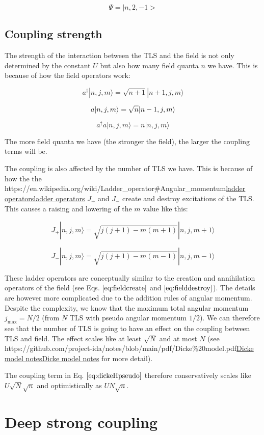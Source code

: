 \documentclass[
]{article}
\let\oldhref\href
\renewcommand{\href}[2]{\ifx#1\urlprefix\oldhref{#1}{#2}\else\uline{\oldhref{#1}{#2}}\fi}
\renewcommand{\[}{\begin{equation}}
\renewcommand{\]}{\end{equation}}
\begin{document}
\[
\Psi = |n,2,-1>
\]

\subsection{Coupling strength}\label{coupling-strength}

The strength of the interaction between the TLS and the field is not
only determined by the constant \(U\) but also how many field quanta
\(n\) we have. This is because of how the field operators work:

\[
a^{\dagger} |n,j,m\rangle = \sqrt{n+1}|n+1,j,m\rangle
\label{eq:fieldcreate}
\]

\[
a |n,j,m\rangle = \sqrt{n}|n-1,j,m\rangle \\
\label{eq:fielddestroy}
\]

\[
a^{\dagger}a |n,j,m\rangle = n|n,j,m\rangle
\]

The more field quanta we have (the stronger the field), the larger the
coupling terms will be.

The coupling is also affected by the number of TLS we have. This is
because of how the the
\href{https://en.wikipedia.org/wiki/Ladder_operator\#Angular_momentum}{ladder
operators} \(J_{+}\) and \(J_{-}\) create and destroy excitations of the
TLS. This causes a raising and lowering of the \(m\) value like this:

\[
J_+ |n, j, m\rangle  =  \sqrt{j(j + 1) - m(m + 1)} |n, j, m + 1\rangle
\]

\[
J_- |n, j, m\rangle =  \sqrt{j(j + 1) - m(m - 1)} |n, j, m - 1\rangle
\]

These ladder operators are conceptually similar to the creation and
annihilation operators of the field (see Eqs. \(\ref{eq:fieldcreate}\)
and \(\ref{eq:fielddestroy}\)). The details are however more complicated
due to the addition rules of angular momentum. Despite the complexity,
we know that the maximum total angular momentum \(j_{\max} = N/2\) (from
\(N\) TLS with pseudo angular momentum \(1/2\)). We can therefore see
that the number of TLS is going to have an effect on the coupling
between TLS and field. The effect scales like at least \(\sqrt{N}\) and
at most \(N\) (see
\href{https://github.com/project-ida/notes/blob/main/pdf/Dicke\%20model.pdf}{Dicke
model notes} for more detail).

The coupling term in Eq. \(\ref{eq:dickeHpseudo}\) therefore
conservatively scales like \(U\sqrt{N}\sqrt{n}\) and optimistically as
\(UN\sqrt{n}\).

\section{Deep strong coupling}\label{deep-strong-coupling}
\end{document}
